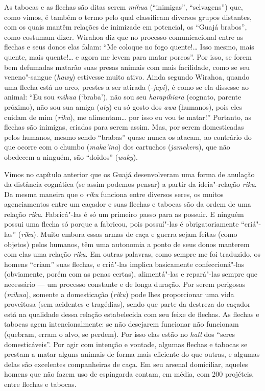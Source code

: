 As tabocas e as flechas são ditas serem \emph{mihua} (``inimigas'',
``selvagens'') que, como vimos, é também o termo pelo qual classificam
diversos grupos distantes, com os quais mantêm relações de inimizade em
potencial, os ``Guajá brabos'', como costumam dizer. Wirahoa diz que no
processo comunicacional entre as flechas e seus donos elas falam: ``Me
coloque no fogo quente!\ldots{} Isso mesmo, mais quente, mais quente!\ldots{} e
agora me levem para matar porcos''. Por isso, se forem bem defumadas
matarão suas presas animais com mais facilidade, como se seu
veneno"-sangue (\emph{hawy}) estivesse muito ativo. Ainda segundo
Wirahoa, quando uma flecha está no arco, prestes a ser atirada
(-\emph{japi}), é como se ela dissesse ao animal: ``Eu sou \emph{mihua}
(`braba'), não sou seu \emph{harapihiara} (cognato, parente próximo),
não sou sua amiga (\emph{aty}) eu só gosto dos \emph{awa} (humanos),
pois eles cuidam de mim (\emph{riku}), me alimentam\ldots{} por isso eu vou
te matar!'' Portanto, as flechas são inimigas, criadas para serem assim.
Mas, por serem domesticadas pelos humanos, mesmo sendo ``brabas'' quase
nunca os atacam, ao contrário do que ocorre com o chumbo
(\emph{maka'ina}) dos cartuchos (\emph{jamekera}), que não obedecem a
ninguém, são ``doidos'' (\emph{waky}).

Vimos no capítulo anterior que os Guajá desenvolveram uma forma de
anulação da distância cognática (se assim podemos pensar) a partir da
ideia"-relação \emph{riku}. Da mesma maneira que o \emph{riku} funciona
entre diversos seres, os muitos agenciamentos entre um caçador e suas
flechas e tabocas são da ordem de uma relação \emph{riku}. Fabricá"-las é
só um primeiro passo para as possuir. E ninguém possui uma flecha só
porque a fabricou, pois possuí"-las é obrigatoriamente ``criá"-las''
(\emph{riku}). Muito embora essas armas de caça e guerra sejam feitas
(como objetos) pelos humanos, têm uma autonomia a ponto de seus donos
manterem com elas uma relação \emph{riku}. Em outras palavras, como
sempre me foi traduzido, os homens ``criam'' suas flechas, e criá"-las
implica basicamente confeccioná"-las (obviamente, porém com as penas
certas), alimentá"-las e repará"-las sempre que necessário --- um processo
constante e de longa duração. Por serem perigosas (\emph{mihua}),
somente a domesticação (\emph{riku}) pode lhes proporcionar uma vida
proveitosa (sem acidentes e tragédias), sendo que parte da destreza do
caçador está na qualidade dessa relação estabelecida com seu feixe de
flechas. As flechas e tabocas agem intencionalmente: se não desejarem
funcionar não funcionam (quebram, erram o alvo, se perdem). Por isso
elas estão no \emph{hall} dos ``seres domesticáveis''. Por agir com
intenção e vontade, algumas flechas e tabocas se prestam a matar alguns
animais de forma mais eficiente do que outras, e algumas delas são
excelentes companheiras de caça. Em seu arsenal domiciliar, aqueles
homens que não fazem uso de espingarda contam, em média, com 200
projéteis, entre flechas e tabocas.

